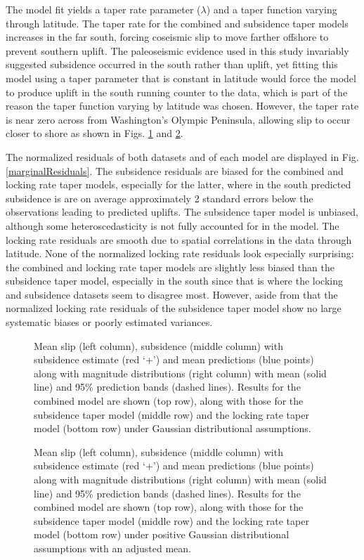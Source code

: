 {The model fit yields a taper rate parameter ($\lambda$) and a taper function varying through latitude.  The taper rate for the combined and subsidence taper models increases in the far south, forcing coseismic slip to move farther offshore to prevent southern uplift.  The paleoseismic evidence used in this study invariably suggested subsidence occurred in the south rather than uplift, yet fitting this model using a taper parameter that is constant in latitude would force the model to produce uplift in the south running counter to the data, which is part of the reason the taper function varying by latitude was chosen.  However, the taper rate is near zero across from Washington's Olympic Peninsula, allowing slip to occur closer to shore as shown in Figs. \ref{modelSummaryN} and \ref{modelSummaryPNAdj}.

The normalized residuals of both datasets and of each model are displayed in Fig. \ref{marginalResiduals}.  The subsidence residuals are biased for the combined and locking rate taper models, especially for the latter, where in the south predicted subsidence is are on average approximately 2 standard errors below the observations leading to predicted uplifts.  The subsidence taper model is unbiased, although some heteroscedasticity is not fully accounted for in the model.  The locking rate residuals are smooth due to spatial correlations in the data through latitude.  None of the normalized locking rate residuals look especially surprising: the combined and locking rate taper models are slightly less biased than the subsidence taper model, especially in the south since that is where the locking and subsidence datasets seem to disagree most.  However, aside from that the normalized locking rate residuals of the subsidence taper model show no large systematic biases or poorly estimated variances.

\begin{figure}
\centering
{}
\caption{Mean slip (left column), subsidence (middle column) with subsidence estimate (red `+') and mean predictions (blue points) along with magnitude distributions (right column) with mean (solid line) and 95\% prediction bands (dashed lines).  Results for the combined model are shown (top row), along with those for the subsidence taper model (middle row) and the locking rate taper model (bottom row) under Gaussian distributional assumptions.}
\label{modelSummaryN}
\end{figure}

\begin{figure}
\centering
{}
\caption{Mean slip (left column), subsidence (middle column) with subsidence estimate (red `+') and mean predictions (blue points) along with magnitude distributions (right column) with mean (solid line) and 95\% prediction bands (dashed lines).  Results for the combined model are shown (top row), along with those for the subsidence taper model (middle row) and the locking rate taper model (bottom row) under positive Gaussian distributional assumptions with an adjusted mean.}
\label{modelSummaryPNAdj}
\end{figure}

}
